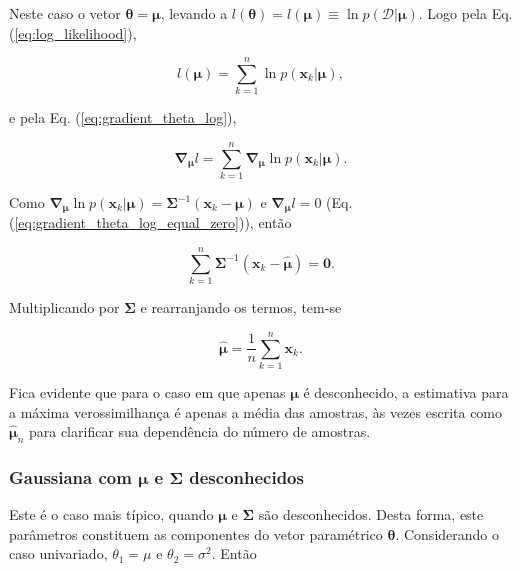 \documentclass[a4paper,12pt,twocolumn]{article}
\newcommand{\equationref}[1]{Eq. (\ref{eq:#1})}
\begin{document}
Neste caso o vetor $\boldsymbol{\theta} = \boldsymbol{\mu}$, levando a $l(\boldsymbol{\theta}) = l(\boldsymbol{\mu}) \equiv \ln p(\mathcal{D}|\boldsymbol{\mu})$. Logo pela \equationref{log_likelihood},

\begin{equation}
    l(\boldsymbol{\mu}) = \sum_{k=1}^{n} \ln p(\boldsymbol{x}_k|\boldsymbol{\mu}),
    \label{eq:log_mu}
\end{equation}

\noindent e pela \equationref{gradient_theta_log},

\begin{equation}
    \boldsymbol{\nabla}_{\boldsymbol{\mu}} l = \sum_{k=1}^{n} \boldsymbol{\nabla}_{\boldsymbol{\mu}} \ln p(\boldsymbol{x}_k|\boldsymbol{\mu}).
    \label{eq:nabla_mu_log}
\end{equation}

\noindent Como $\boldsymbol{\nabla}_{\boldsymbol{\mu}} \ln p(\boldsymbol{x}_k|\boldsymbol{\mu}) = \boldsymbol{\Sigma}^{-1} (\boldsymbol{x}_k - \boldsymbol{\mu})$ e $\boldsymbol{\nabla}_{\boldsymbol{\mu}} l = 0$ (\equationref{gradient_theta_log_equal_zero}), então

\begin{equation}
    \sum_{k=1}^{n} \boldsymbol{\Sigma}^{-1} (\boldsymbol{x}_k - \boldsymbol{\hat{\mu}}) = \boldsymbol{0}.
    \label{eq:nabla_mu_log_equals_zero}
\end{equation}

\noindent Multiplicando por $\boldsymbol{\Sigma}$ e rearranjando os termos, tem-se

\begin{equation}
    \boldsymbol{\hat{\mu}} = \frac{1}{n} \sum_{k=1}^{n} \boldsymbol{x}_k.
    \label{eq:mu_optimum_case_1}
\end{equation}

Fica evidente que para o caso em que apenas $\boldsymbol{\mu}$ é desconhecido, a estimativa para a máxima verossimilhança é apenas a média das amostras, às vezes escrita como $\boldsymbol{\hat{\mu}}_n$ para clarificar sua dependência do número de amostras.

\subsubsection*{Gaussiana com $\boldsymbol{\mu}$ e $\boldsymbol{\Sigma}$ desconhecidos}

Este é o caso mais típico, quando $\boldsymbol{\mu}$ e $\boldsymbol{\Sigma}$ são desconhecidos. Desta forma, este parâmetros constituem as componentes do vetor paramétrico $\boldsymbol{\theta}$. Considerando o caso univariado, $\theta_1 = \mu$ e $\theta_2 = \sigma^2$. Então
\end{document}
